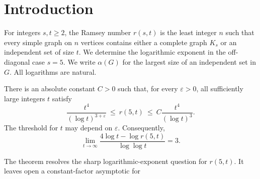 \section{Introduction}
\label{sec:introduction}

For integers \(s,t\ge2\), the Ramsey number \(r(s,t)\) is the least
integer \(n\) such that every simple graph on \(n\) vertices contains
either a complete graph \(K_s\) or an independent set of size \(t\).
We determine the logarithmic exponent in the off-diagonal case \(s=5\).
We write \(\alpha(G)\) for the largest size of an independent set in \(G\).
All logarithms are natural.

\begin{theorem}
\label{thm:main}
There is an absolute constant \(C>0\) such that, for every
\(\varepsilon>0\), all sufficiently large integers \(t\) satisfy
\[
 \frac{t^4}{(\log t)^{3+\varepsilon}}
 \ \le\ r(5,t)\ \le\
 C\frac{t^4}{(\log t)^3}.
\]
The threshold for \(t\) may depend on \(\varepsilon\).
Consequently,
\[
 \lim_{t\to\infty}
 \frac{4\log t-\log r(5,t)}{\log\log t}=3.
\]
\end{theorem}

The theorem resolves the sharp logarithmic-exponent question for
\(r(5,t)\). It leaves open a constant-factor asymptotic for
